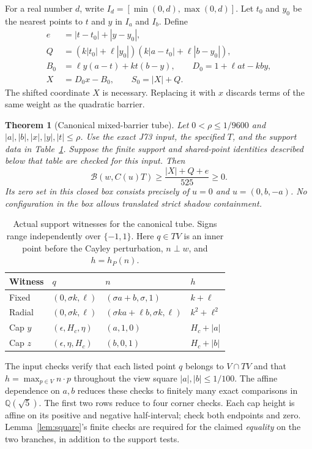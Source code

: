 \documentclass[11pt]{amsart}
\newcommand{\Q}{\mathbb Q}
\newtheorem{theorem}{Theorem}[section]
\theoremstyle{definition}
\theoremstyle{remark}
\begin{document}
For a real number $d$, write $I_d=[\min(0,d),\max(0,d)]$.
Let $t_0$ and $y_0$ be the nearest points to $t$ and $y$ in $I_a$ and
$I_b$. Define
\begin{align}
 e&=|t-t_0|+|y-y_0|,\nonumber\\
 Q&=(k|t_0|+\ell|y_0|)(k|a-t_0|+\ell|b-y_0|),\label{eq:clamp}\\
 B_0&=\ell y(a-t)+kt(b-y),\qquad D_0=1+\ell at-kby,\nonumber\\
 X&=D_0x-B_0,\qquad S_0=|X|+Q.\nonumber
\end{align}
The shifted coordinate $X$ is necessary. Replacing it with $x$ discards
terms of the same weight as the quadratic barrier.

\begin{theorem}[Canonical mixed-barrier tube]\label{thm:tube}
Let $0<\rho\le1/9600$ and
$|a|,|b|,|x|,|y|,|t|\le\rho$. Use the exact J73 input, the specified
$T$, and the support data in Table~\ref{tab:tubesupport}. Suppose the
finite support and shared-point identities described below that table
are checked for this input. Then
\begin{equation}\label{eq:tubebound}
 \mathcal B(w,C(u)T)\ge\frac{|X|+Q+e}{525}\ge0.
\end{equation}
Its zero set in this closed box consists precisely of
$u=0$ and $u=(0,b,-a)$. No configuration in the box allows translated
strict shadow containment.
\end{theorem}

\begin{table}[ht]
\centering\small
\caption{Actual support witnesses for the canonical tube. Signs range
independently over $\{-1,1\}$. Here $q\in TV$ is an inner point before
the Cayley perturbation, $n\perp w$, and $h=h_P(n)$.}
\label{tab:tubesupport}
\begin{tabular}{@{}llll@{}}
\toprule
Witness & $q$ & $n$ & $h$\\
\midrule
Fixed & $(0,\sigma k,\ell)$ & $(\sigma a+b,\sigma,1)$ & $k+\ell$\\
Radial & $(0,\sigma k,\ell)$ & $(\sigma ka+\ell b,\sigma k,\ell)$ & $k^2+\ell^2$\\
Cap $y$ & $(\epsilon,H_c,\eta)$ & $(a,1,0)$ & $H_c+|a|$\\
Cap $z$ & $(\epsilon,\eta,H_c)$ & $(b,0,1)$ & $H_c+|b|$\\
\bottomrule
\end{tabular}
\end{table}

The input checks verify that each listed point $q$ belongs to $V\cap TV$
and that $h=\max_{p\in V}n\cdot p$ throughout the view square
$|a|,|b|\le1/100$. The affine dependence on $a,b$ reduces these checks
to finitely many exact comparisons in $\Q(\sqrt5)$. The first two rows
reduce to four corner checks. Each cap height is affine on its positive
and negative half-interval; check both endpoints and zero.
Lemma~\ref{lem:square}'s finite checks are required for the claimed
\emph{equality} on the two branches, in addition to the support tests.
\end{document}
